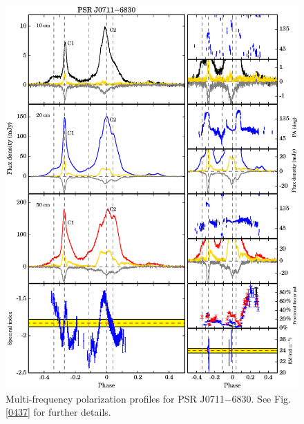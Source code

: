 \documentclass[useAMS,usenatbib]{mn2e}
\begin{document}
\begin{appendices}
\begin{figure}
\begin{center}
\includegraphics[width=6 in]{0711.ps}
\caption{Multi-frequency polarization profiles for PSR J0711$-$6830. 
See Fig. \ref{0437} for further details.}
\label{0711}
\end{center}
\end{figure}


\end{appendices}
\end{document}

